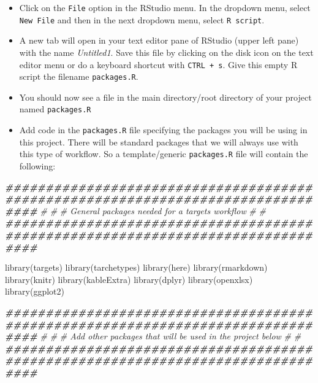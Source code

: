 \documentclass[
  12pt,
]{book}
\newenvironment{Shaded}{\begin{snugshade}}{\end{snugshade}}
\newcommand{\CommentTok}[1]{\textcolor[rgb]{0.56,0.35,0.01}{\textit{#1}}}
\newcommand{\DocumentationTok}[1]{\textcolor[rgb]{0.56,0.35,0.01}{\textbf{\textit{#1}}}}
\newcommand{\FunctionTok}[1]{\textcolor[rgb]{0.00,0.00,0.00}{#1}}
\newcommand{\NormalTok}[1]{#1}
\begin{document}
\begin{itemize}
\item
  Click on the \texttt{File} option in the RStudio menu. In the dropdown menu, select \texttt{New\ File} and then in the next dropdown menu, select \texttt{R\ script}.
\item
  A new tab will open in your text editor pane of RStudio (upper left pane) with the name \emph{Untitled1}. Save this file by clicking on the disk icon on the text editor menu or do a keyboard shortcut with \texttt{CTRL\ +\ s}. Give this empty R script the filename \texttt{packages.R}.
\item
  You should now see a file in the main directory/root directory of your project named \texttt{packages.R}
\item
  Add code in the \texttt{packages.R} file specifying the packages you will be using in this project. There will be standard packages that we will always use with this type of workflow. So a template/generic \texttt{packages.R} file will contain the following:
\end{itemize}

\begin{Shaded}
\begin{Highlighting}[]
\DocumentationTok{\#\#\#\#\#\#\#\#\#\#\#\#\#\#\#\#\#\#\#\#\#\#\#\#\#\#\#\#\#\#\#\#\#\#\#\#\#\#\#\#\#\#\#\#\#\#\#\#\#\#\#\#\#\#\#\#\#\#\#\#\#\#\#\#\#\#\#\#\#\#\#\#\#\#\#\#\#\#\#\#}
\CommentTok{\#}
\CommentTok{\#\textquotesingle{}}
\CommentTok{\#\textquotesingle{} General packages needed for a targets workflow}
\CommentTok{\#\textquotesingle{}}
\CommentTok{\#}
\DocumentationTok{\#\#\#\#\#\#\#\#\#\#\#\#\#\#\#\#\#\#\#\#\#\#\#\#\#\#\#\#\#\#\#\#\#\#\#\#\#\#\#\#\#\#\#\#\#\#\#\#\#\#\#\#\#\#\#\#\#\#\#\#\#\#\#\#\#\#\#\#\#\#\#\#\#\#\#\#\#\#\#\#}

\FunctionTok{library}\NormalTok{(targets)}
\FunctionTok{library}\NormalTok{(tarchetypes)}
\FunctionTok{library}\NormalTok{(here)}
\FunctionTok{library}\NormalTok{(rmarkdown)}
\FunctionTok{library}\NormalTok{(knitr)}
\FunctionTok{library}\NormalTok{(kableExtra)}
\FunctionTok{library}\NormalTok{(dplyr)}
\FunctionTok{library}\NormalTok{(openxlsx)}
\FunctionTok{library}\NormalTok{(ggplot2)}


\DocumentationTok{\#\#\#\#\#\#\#\#\#\#\#\#\#\#\#\#\#\#\#\#\#\#\#\#\#\#\#\#\#\#\#\#\#\#\#\#\#\#\#\#\#\#\#\#\#\#\#\#\#\#\#\#\#\#\#\#\#\#\#\#\#\#\#\#\#\#\#\#\#\#\#\#\#\#\#\#\#\#\#\#}
\CommentTok{\#}
\CommentTok{\#\textquotesingle{}}
\CommentTok{\#\textquotesingle{} Add other packages that will be used in the project below}
\CommentTok{\#\textquotesingle{}}
\CommentTok{\#}
\DocumentationTok{\#\#\#\#\#\#\#\#\#\#\#\#\#\#\#\#\#\#\#\#\#\#\#\#\#\#\#\#\#\#\#\#\#\#\#\#\#\#\#\#\#\#\#\#\#\#\#\#\#\#\#\#\#\#\#\#\#\#\#\#\#\#\#\#\#\#\#\#\#\#\#\#\#\#\#\#\#\#\#\#}


\end{Highlighting}
\end{Shaded}
\end{document}
